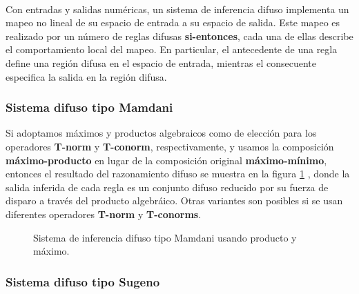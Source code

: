 \documentclass[12pt,letterpaper,oneside] {memoir}
\begin{document}
\paragraph{}
Con entradas y salidas numéricas, un sistema de inferencia difuso implementa un mapeo no lineal de su espacio de entrada a su espacio de salida. Este mapeo es realizado por un número de reglas difusas \textbf{si-entonces}, cada una de ellas describe el comportamiento local del  mapeo. En particular, el antecedente de  una regla define  una región difusa en el espacio de entrada, mientras el consecuente especifica la salida en la región difusa.

\subsubsection{Sistema difuso tipo Mamdani}

Si adoptamos máximos y productos algebraicos como de elección para los operadores \textbf{T-norm} y \textbf{T-conorm}, respectivamente, y usamos la composición \textbf{máximo-producto} en lugar  de la composición original \textbf{máximo-mínimo}, entonces el resultado del razonamiento difuso se muestra en la figura \ref{fig:fuzzy22} \citep{Jang1997}, donde la salida inferida de cada regla es un conjunto difuso  reducido por su fuerza de disparo a través del producto algebráico.  Otras variantes son posibles si se usan diferentes operadores \textbf{T-norm} y \textbf{T-conorms}. \\

\begin{figure}[H] 
 \centering 
{} \caption{Sistema de inferencia difuso tipo Mamdani usando producto y máximo.} 
 \label{fig:fuzzy22} 
\end{figure}

\subsubsection{Sistema difuso tipo Sugeno}
\end{document}

